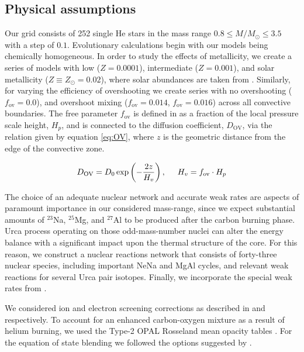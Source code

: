 \documentclass[../../main/thesis_msc.tex]{subfiles}
\begin{document}
\subsection{Physical assumptions} \label{sec:input_physics}
Our grid consists of 252 single He stars in the mass range $0.8 \leq M/M_{\odot} \leq 3.5$ with a step of $0.1$. Evolutionary calculations begin with our models being chemically homogeneous. In order to study the effects of metallicity, we create a series of models with low ($Z=0.0001$), intermediate ($Z=0.001$), and solar metallicity ($Z \equiv Z_{\odot} = 0.02$), where solar abundances are taken from \cite{grevesse1998}. Similarly, for varying the efficiency of overshooting we create series with no overshooting ($f_{\text{ov}} = 0.0$), and overshoot mixing ($f_{\text{ov}} = 0.014$, $f_{\text{ov}} = 0.016$) across all convective boundaries. The free parameter $f_{\text{ov}}$ is defined in \cite{Herwig2000} as a fraction of the local pressure scale height, $H_p$, and is connected to the diffusion coefficient, $D_{\text{OV}}$, via the relation given by equation \ref{eq:OV}, where $z$ is the geometric distance from the edge of the convective zone.
    					
    \begin{align}
    	\label{eq:OV}
    	D_{\text{OV}} = D_0 \exp \left( - \frac{2z}{H_v} \right), \hspace{0.5cm} H_v = f_{\text{ov}} \cdot H_p
    \end{align}

The choice of an adequate nuclear network and accurate weak rates are aspects of paramount importance in our considered mass-range, since we expect substantial amounts of $^{23}$Na, $^{25}$Mg, and $^{27}$Al to be produced after the carbon burning phase. Urca process operating on those odd-mass-number nuclei can alter the energy balance with a significant impact upon the thermal structure of the core. For this reason, we construct a nuclear reactions network that consists of forty-three nuclear species, including important NeNa and MgAl cycles, and relevant weak reactions for several Urca pair isotopes. Finally, we incorporate the special weak rates from \cite{Suzuki2016}.

We considered ion and electron screening corrections as described in \cite{PCR2009} and \cite{Itoh2002} respectively. To account for an enhanced carbon-oxygen mixture as a result of helium burning, we used the Type-2 OPAL Rosseland mean opacity tables \citep{OPAL}. For the equation of state blending we followed the options suggested by \cite{Schwab2017}.
\end{document}
